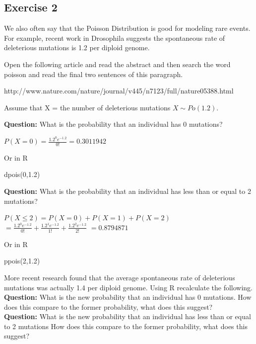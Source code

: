 \documentclass[
  10pt,
  letterpaper,
  DIV=11,
  numbers=noendperiod]{scrartcl}
\newenvironment{Shaded}{\begin{snugshade}}{\end{snugshade}}
\newcommand{\DecValTok}[1]{\textcolor[rgb]{0.68,0.00,0.00}{#1}}
\newcommand{\FloatTok}[1]{\textcolor[rgb]{0.68,0.00,0.00}{#1}}
\newcommand{\FunctionTok}[1]{\textcolor[rgb]{0.28,0.35,0.67}{#1}}
\newcommand{\NormalTok}[1]{\textcolor[rgb]{0.00,0.23,0.31}{#1}}
\begin{document}
\subsection{Exercise 2}\label{exercise-2-1}

We also often say that the Poisson Distribution is good for modeling
rare events. For example, recent work in Drosophila suggests the
spontaneous rate of deleterious mutations is 1.2 per diploid genome.

Open the following article and read the abstract and then search the
word poisson and read the final two sentences of this paragraph.

http://www.nature.com/nature/journal/v445/n7123/full/nature05388.html

Assume that X = the number of deleterious mutations \(X \sim Po(1.2)\).

\textbf{Question:} What is the probability that an individual has 0
mutations?

\(P(X=0)=\frac{1.2^0e^{-1.2}}{0!}=0.3011942\)

Or in R

\begin{Shaded}
\begin{Highlighting}[]
\FunctionTok{dpois}\NormalTok{(}\DecValTok{0}\NormalTok{,}\FloatTok{1.2}\NormalTok{)}
\end{Highlighting}
\end{Shaded}

\textbf{Question:} What is the probability that an individual has less
than or equal to 2 mutations?

\(P(X\le2)=P(X=0)+P(X=1)+P(X=2)\)
\(=\frac{1.2^0e^{-1.2}}{0!}+\frac{1.2^1e^{-1.2}}{1!}+\frac{1.2^2e^{-1.2}}{2!}\)
\(=0.8794871\)

Or in R

\begin{Shaded}
\begin{Highlighting}[]
\FunctionTok{ppois}\NormalTok{(}\DecValTok{2}\NormalTok{,}\FloatTok{1.2}\NormalTok{)}
\end{Highlighting}
\end{Shaded}

More recent research found that the average spontaneous rate of
deleterious mutations was actually 1.4 per diploid genome. Using R
recalculate the following.\\

\textbf{Question:} What is the new probability that an individual has 0
mutations. How does this compare to the former probability, what does
this suggest?\\
\textbf{Question:} What is the new probability that an individual has
less than or equal to 2 mutations How does this compare to the former
probability, what does this suggest?\\
\end{document}
